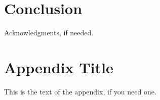 \documentclass[10pt]{sigplanconf}
\begin{document}
\section{Conclusion}




\acks
Acknowledgments, if needed.






\appendix
\section{Appendix Title}

This is the text of the appendix, if you need one.
\end{document}
